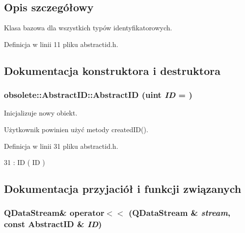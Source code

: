 \subsection{Opis szczegółowy}
Klasa bazowa dla wszystkich typów identyfikatorowych. 

Definicja w linii 11 pliku abstractid.h.



\subsection{Dokumentacja konstruktora i destruktora}
\hypertarget{classobsolete_1_1AbstractID_aff6a5e33261e36af0dcf9b38d99f0056}{
\subsubsection[{AbstractID}]{\setlength{\rightskip}{0pt plus 5cm}obsolete::AbstractID::AbstractID (uint {\em ID} = {})}}
\label{classobsolete_1_1AbstractID_aff6a5e33261e36af0dcf9b38d99f0056}


Inicjalizuje nowy obiekt. 

Użytkownik powinien użyć metody createdID(). 

Definicja w linii 31 pliku abstractid.h.




\begin{DoxyCode}
31 : ID ( ID ) {}
\end{DoxyCode}




\subsection{Dokumentacja przyjaciół i funkcji związanych}
\hypertarget{classobsolete_1_1AbstractID_ae018346f525245975a90a561d3cffccd}{
\subsubsection[{operator$<$$<$}]{\setlength{\rightskip}{0pt plus 5cm}QDataStream\& operator$<$$<$ (QDataStream \& {\em stream}, \/  const {\bf AbstractID} \& {\em ID})}}
\label{classobsolete_1_1AbstractID_ae018346f525245975a90a561d3cffccd}


